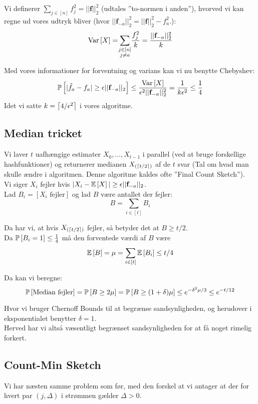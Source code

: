 Vi definerer $\sum_{j \in [n]} f_j^2 = || \mathbf f ||_2^2$ (udtales ''to-normen i anden''), hvorved vi kan regne ud vores udtryk bliver (hvor $|| \mathbf f_{-a} ||_2^2 = || \mathbf f ||_2^2 - f_a^2$.):
$$
\Var{X} = \summ{j \in [n]\\ j \neq a} \frac{f_j^2}{k} = \frac{|| \mathbf f_{-a} ||_2^2}{k}
$$

Med vores informationer for forventning og varians kan vi nu benytte Chebyshev:
$$
\P{|\hat f_a - f_a| \geq \epsilon || \mathbf f_{-a} ||_2}
\leq \frac{\Var{X}}{\epsilon^2 ||\mathbf f_{-a}||_2^2}
= \frac{1}{k \epsilon^2}
\leq \frac{1}{4}
$$
Idet vi satte $k = \ceil{4 / \epsilon^2}$ i vores algoritme.


\subsection{Median tricket}
Vi laver $t$ uafhængige estimater $X_0, \dots, X_{t-1}$ i parallel (ved at bruge forskellige hashfunktioner) og returnerer medianen $X_{(\ceil{t/2})}$ af de $t$ svar (Tal om hvad man skulle ændre i algoritmen. Denne algoritme kaldes ofte ''Final Count Sketch'').\\

Vi siger $X_i$ fejler hvis $|X_i - \E{X}| \geq \epsilon || \mathbf f_{-a} ||_2$.\\
Lad $B_i = [X_i \text{ fejler}]$ og lad $B$ være antallet der fejler:
$$
B = \sum_{i \in [t]} B_i
$$


Da har vi, at hvis $X_{(\ceil{t/2})}$ fejler, så betyder det at $B \geq t/2$.\\
Da $\P{B_i = 1} \leq \frac{1}{4}$ må den forventede værdi af $B$ være
$$
\E{B} = \mu = \sum_{i \in [t]} \E{B_i} \leq t/4
$$

Da kan vi beregne:
$$
\P{\text{Median fejler}}
= \P{B \geq 2 \mu}
= \P{B \geq (1 + \delta) \mu }
\leq e^{- \delta^2 \mu / 3}
\leq e^{-t/12}
$$

Hvor vi bruger Chernoff Bounds til at begrænse sandsynligheden, og herudover i eksponentialet benytter $\delta = 1$.\\

Herved har vi altså væsentligt begrænset sandsynligheden for at få noget rimelig forkert.

\subsection{Count-Min Sketch}
Vi har næsten samme problem som før, med den forskel at vi antager at der for hvert par $(j, \Delta)$ i strømmen gælder $\Delta > 0$.

